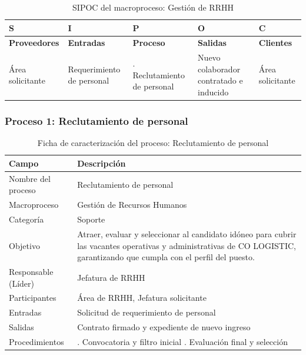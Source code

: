\documentclass[11pt, a4paper, oneside]{report}
\begin{document}
\begin{table}[H]
\centering\small
\renewcommand{\arraystretch}{1.3}
\setlength{\tabcolsep}{4pt}
\begin{tabularx}{\textwidth}{|>{\raggedright\arraybackslash}p{}|>{\raggedright\arraybackslash}p{}|>{\raggedright\arraybackslash}p{}|>{\raggedright\arraybackslash}p{}|>{\raggedright\arraybackslash}X|}
\hline
\rowcolor{upeu_dark}
\color{white}\bfseries S & \color{white}\bfseries I & \color{white}\bfseries P & \color{white}\bfseries O & \color{white}\bfseries C \\ \hline
\rowcolor{upeu_light}
\bfseries Proveedores & \bfseries Entradas & \bfseries Proceso & \bfseries Salidas & \bfseries Clientes \\ \hline
Área solicitante &
Requerimiento de personal &
1. Reclutamiento de personal &
Nuevo colaborador contratado e inducido &
Área solicitante \\ \hline
\end{tabularx}
\caption{SIPOC del macroproceso: Gestión de RRHH}
\end{table}

\subsubsection{Proceso 1: Reclutamiento de personal}

\begin{table}[H]
\centering\small
\renewcommand{\arraystretch}{1.35}
\setlength{\tabcolsep}{6pt}
\begin{tabularx}{\textwidth}{|>{\raggedright\arraybackslash}p{}|>{\raggedright\arraybackslash}X|}
\hline
\rowcolor{upeu_dark}
\color{white}\bfseries Campo & \color{white}\bfseries Descripción \\ \hline
\rowcolor{gray!10}
Nombre del proceso & Reclutamiento de personal \\ \hline
Macroproceso & Gestión de Recursos Humanos \\ \hline
\rowcolor{gray!10}
Categoría & Soporte \\ \hline
Objetivo & Atraer, evaluar y seleccionar al candidato idóneo para cubrir las vacantes operativas y administrativas de CO LOGISTIC, garantizando que cumpla con el perfil del puesto. \\ \hline
\rowcolor{gray!10}
Responsable (Líder) & Jefatura de RRHH \\ \hline
Participantes & Área de RRHH, Jefatura solicitante \\ \hline
\rowcolor{gray!10}
Entradas & Solicitud de requerimiento de personal \\ \hline
Salidas & Contrato firmado y expediente de nuevo ingreso \\ \hline
\rowcolor{gray!10}
Procedimientos & 1. Convocatoria y filtro inicial \newline 2. Evaluación final y selección \\ \hline
\end{tabularx}
\caption{Ficha de caracterización del proceso: Reclutamiento de personal}
\end{table}
\end{document}
